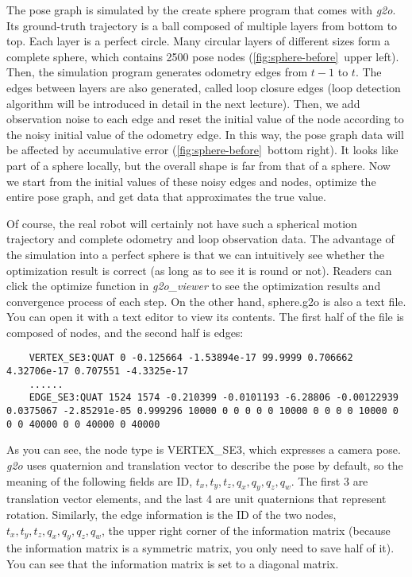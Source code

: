 The pose graph is simulated by the create sphere program that comes with \textit{g2o}. Its ground-truth trajectory is a ball composed of multiple layers from bottom to top. Each layer is a perfect circle. Many circular layers of different sizes form a complete sphere, which contains 2500 pose nodes (\autoref{fig:sphere-before}~upper left). Then, the simulation program generates odometry edges from $t-1$ to $t$. The edges between layers are also generated, called loop closure edges (loop detection algorithm will be introduced in detail in the next lecture). Then, we add observation noise to each edge and reset the initial value of the node according to the noisy initial value of the odometry edge. In this way, the pose graph data will be affected by accumulative error (\autoref{fig:sphere-before}~bottom right). It looks like part of a sphere locally, but the overall shape is far from that of a sphere. Now we start from the initial values of these noisy edges and nodes, optimize the entire pose graph, and get data that approximates the true value.

Of course, the real robot will certainly not have such a spherical motion trajectory and complete odometry and loop observation data. The advantage of the simulation into a perfect sphere is that we can intuitively see whether the optimization result is correct (as long as to see it is round or not). Readers can click the optimize function in \textit{g2o\_viewer} to see the optimization results and convergence process of each step. On the other hand, sphere.g2o is also a text file. You can open it with a text editor to view its contents. The first half of the file is composed of nodes, and the second half is edges:

\begin{lstlisting}
	VERTEX_SE3:QUAT 0 -0.125664 -1.53894e-17 99.9999 0.706662 4.32706e-17 0.707551 -4.3325e-17 
	......
	EDGE_SE3:QUAT 1524 1574 -0.210399 -0.0101193 -6.28806 -0.00122939 0.0375067 -2.85291e-05 0.999296 10000 0 0 0 0 0 10000 0 0 0 0 10000 0 0 0 40000 0 0 40000 0 40000 
\end{lstlisting}

As you can see, the node type is VERTEX\_SE3, which expresses a camera pose. \textit{g2o} uses quaternion and translation vector to describe the pose by default, so the meaning of the following fields are ID, $t_x, t_y, t_z, q_x, q_y, q_z, q_w$. The first 3 are translation vector elements, and the last 4 are unit quaternions that represent rotation. Similarly, the edge information is the ID of the two nodes, $t_x, t_y, t_z, q_x, q_y, q_z, q_w$, the upper right corner of the information matrix (because the information matrix is a symmetric matrix, you only need to save half of it). You can see that the information matrix is set to a diagonal matrix.

